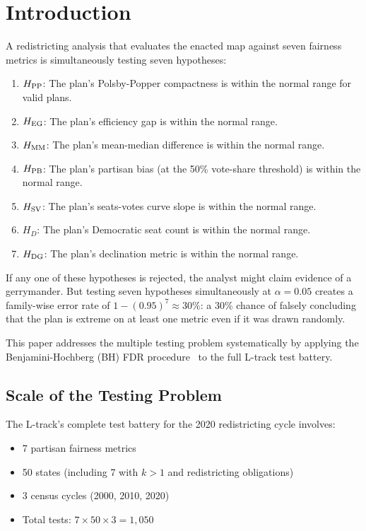 \section{Introduction}
\label{sec:introduction}

A redistricting analysis that evaluates the enacted map against seven
fairness metrics is simultaneously testing seven hypotheses:
\begin{enumerate}
\item $H_{\mathrm{PP}}$: The plan's Polsby-Popper compactness is within the
  normal range for valid plans.
\item $H_{\rm EG}$: The plan's efficiency gap is within the normal range.
\item $H_{\rm MM}$: The plan's mean-median difference is within the
  normal range.
\item $H_{\rm PB}$: The plan's partisan bias (at the 50\% vote-share
  threshold) is within the normal range.
\item $H_{\rm SV}$: The plan's seats-votes curve slope is within the
  normal range.
\item $H_D$: The plan's Democratic seat count is within the normal range.
\item $H_{\rm DG}$: The plan's declination metric is within the normal range.
\end{enumerate}

If any one of these hypotheses is rejected, the analyst might claim
evidence of a gerrymander.
But testing seven hypotheses simultaneously at $\alpha = 0.05$ creates
a family-wise error rate of $1 - (0.95)^7 \approx 30\%$: a 30\% chance
of falsely concluding that the plan is extreme on at least one metric
even if it was drawn randomly.

This paper addresses the multiple testing problem systematically by
applying the Benjamini-Hochberg (BH) FDR procedure~\citep{bh1995} to
the full L-track test battery.

\subsection{Scale of the Testing Problem}

The L-track's complete test battery for the 2020 redistricting cycle
involves:
\begin{itemize}
\item 7 partisan fairness metrics
\item 50 states (including 7 with $k > 1$ and redistricting obligations)
\item 3 census cycles (2000, 2010, 2020)
\item Total tests: $7 \times 50 \times 3 = 1{,}050$
\end{itemize}

